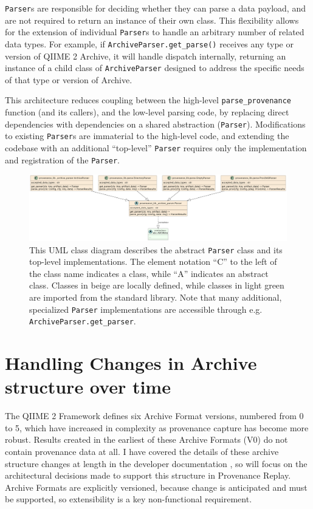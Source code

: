 \texttt{Parser}s are responsible for deciding whether they can parse a data payload, and
are not required to return an instance of their own class. This flexibility
allows for the extension of individual \texttt{Parser}s to handle an arbitrary number of
related data types. For example, if \texttt{ArchiveParser.get\_parse()} receives any type
or version of QIIME 2 Archive, it will handle dispatch internally, returning an
instance of a child class of \texttt{ArchiveParser} designed to address the specific
needs of that type or version of Archive.

This architecture reduces coupling between the high-level \texttt{parse\_provenance}
function (and its callers), and the low-level parsing code, by replacing direct
dependencies with dependencies on a shared abstraction (\texttt{Parser}). Modifications
to existing \texttt{Parser}s are immaterial to the high-level code, and extending the
codebase with an additional “top-level” \texttt{Parser} requires only the implementation
and registration of the \texttt{Parser}. 

\begin{figure}[htp]
\centering
\includegraphics[width=\textwidth]{figures/allParsersUML.png}
\caption[UML Class diagram of the abstract Parser class and its implementations]%
{This UML class diagram describes the abstract \texttt{Parser} class and its top-level
implementations. The element notation “C” to the left of the class name
indicates a class, while “A” indicates an abstract class. Classes in beige are
locally defined, while classes in light green are imported from the standard
library. Note that many additional, specialized \texttt{Parser} implementations are
accessible through e.g. \texttt{ArchiveParser.get\_parser}.}
\label{fig:allParsersUML}
\end{figure}


\section{Handling Changes in Archive structure over time}
\label{section:archive_versions}

The QIIME 2 Framework defines six Archive Format versions, numbered from 0 to 5,
which have increased in complexity as provenance capture has become more robust.
Results created in the earliest of these Archive Formats (V0) do not contain
provenance data at all. I have covered the details of these archive structure
changes at length in the developer documentation \parencite{qiime_2_development_team_archive_2018},
so will focus on the architectural decisions made to support this structure in
Provenance Replay. Archive Formats are explicitly versioned, because change is
anticipated and must be supported, so extensibility is a key non-functional
requirement.

